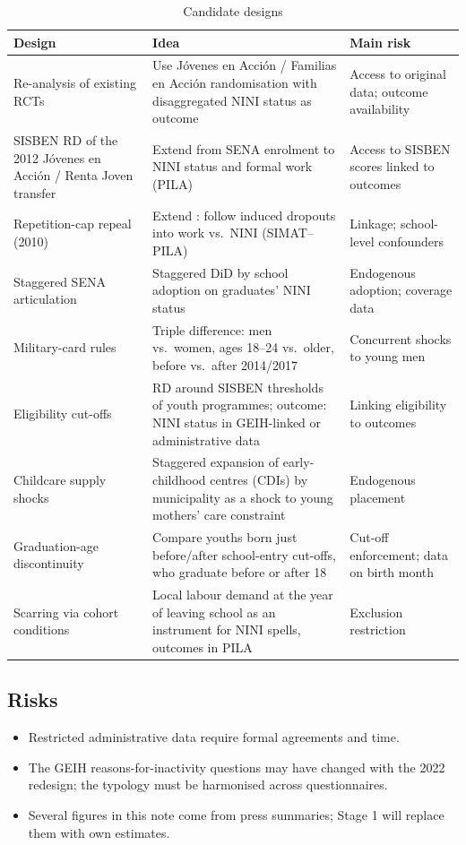 \documentclass[11pt]{article}
\begin{document}
\begin{table}[htbp]
\centering\small
\caption{Candidate designs}\label{tab:designs}
\begin{tabularx}{\linewidth}{P{3.6cm}LP{3.2cm}}
\toprule
Design & Idea & Main risk \\
\midrule
Re-analysis of existing RCTs & Use J\'ovenes en Acci\'on / Familias en Acci\'on randomisation with disaggregated NINI status as outcome & Access to original data; outcome availability \\
SISBEN RD of the 2012 J\'ovenes en Acci\'on / Renta Joven transfer & Extend \citet{gamboa2021} from SENA enrolment to NINI status and formal work (PILA) & Access to SISBEN scores linked to outcomes \\
Repetition-cap repeal (2010) & Extend \citet{ferreira2020}: follow induced dropouts into work vs.\ NINI (SIMAT--PILA) & Linkage; school-level confounders \\
Staggered SENA articulation & Staggered DiD by school adoption on graduates' NINI status & Endogenous adoption; coverage data \\
Military-card rules & Triple difference: men vs.\ women, ages 18--24 vs.\ older, before vs.\ after 2014/2017 & Concurrent shocks to young men \\
Eligibility cut-offs & RD around SISBEN thresholds of youth programmes; outcome: NINI status in GEIH-linked or administrative data & Linking eligibility to outcomes \\
Childcare supply shocks & Staggered expansion of early-childhood centres (CDIs) by municipality as a shock to young mothers' care constraint & Endogenous placement \\
Graduation-age discontinuity & Compare youths born just before/after school-entry cut-offs, who graduate before or after 18 & Cut-off enforcement; data on birth month \\
Scarring via cohort conditions & Local labour demand at the year of leaving school as an instrument for NINI spells, outcomes in PILA & Exclusion restriction \\
\bottomrule
\end{tabularx}
\end{table}

\subsection{Risks}

\begin{itemize}
\item Restricted administrative data require formal agreements and time.
\item The GEIH reasons-for-inactivity questions may have changed with the 2022 redesign; the typology must be harmonised across questionnaires.
\item Several figures in this note come from press summaries; Stage 1 will replace them with own estimates.
\end{itemize}
\end{document}
